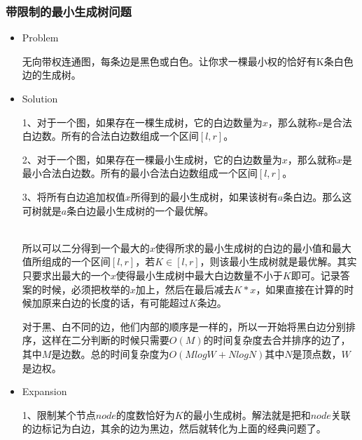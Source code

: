 	\subsubsection{带限制的最小生成树问题}
	\begin{itemize}
		\item Problem \par
			无向带权连通图，每条边是黑色或白色。让你求一棵最小权的恰好有K条白色边的生成树。
		\item Solution \par
			1、对于一个图，如果存在一棵生成树，它的白边数量为$x$，那么就称$x$是合法白边数。所有的合法白边数组成一个区间$[l,r]$。\par
			2、对于一个图，如果存在一棵最小生成树，它的白边数量为$x$，那么就称$x$是最小合法白边数。所有的最小合法白边数组成一个区间$[l,r]$。\par
			3、将所有白边追加权值$x$所得到的最小生成树，如果该树有$a$条白边。那么这可树就是$a$条白边最小生成树的一个最优解。

			~\\
			所以可以二分得到一个最大的$x$使得所求的最小生成树的白边的最小值和最大值所组成的一个区间$[l,r]$，若$K\in [l,r]$，则该最小生成树就是最优解。其实只要求出最大的一个$x$使得最小生成树中最大白边数量不小于$K$即可。记录答案的时候，必须把枚举的$x$加上，然后在最后减去$K*x$，如果直接在计算的时候加原来白边的长度的话，有可能超过$K$条边。\par
			对于黑、白不同的边，他们内部的顺序是一样的，所以一开始将黑白边分别排序，这样在二分判断的时候只需要$O(M)$的时间复杂度去合并排序的边了，其中$M$是边数。总的时间复杂度为$O(MlogW+NlogN)$其中$N$是顶点数，$W$是边权。

		\item Expansion \par
			1、限制某个节点$node$的度数恰好为$K$的最小生成树。解法就是把和$node$关联的边标记为白边，其余的边为黑边，然后就转化为上面的经典问题了。
	\end{itemize}

